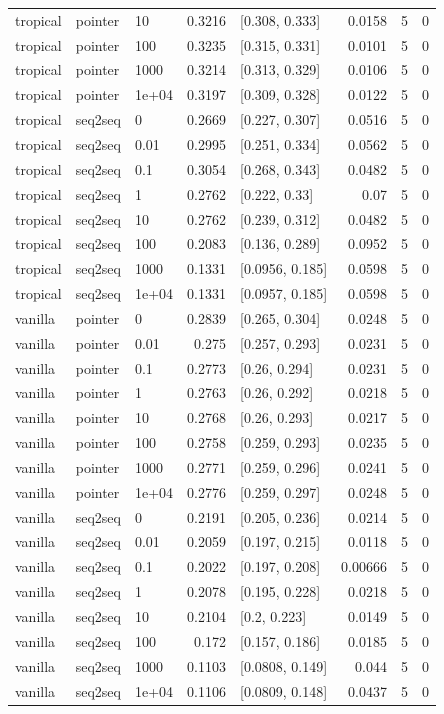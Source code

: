 \documentclass[10pt]{article}
\begin{document}
{\begin{longtable}{lllrlrrr}
tropical & pointer & 10 & 0.3216 & [0.308, 0.333] & 0.0158 & 5 & 0\\
tropical & pointer & 100 & 0.3235 & [0.315, 0.331] & 0.0101 & 5 & 0\\
tropical & pointer & 1000 & 0.3214 & [0.313, 0.329] & 0.0106 & 5 & 0\\
tropical & pointer & 1e+04 & 0.3197 & [0.309, 0.328] & 0.0122 & 5 & 0\\
tropical & seq2seq & 0 & 0.2669 & [0.227, 0.307] & 0.0516 & 5 & 0\\
tropical & seq2seq & 0.01 & 0.2995 & [0.251, 0.334] & 0.0562 & 5 & 0\\
tropical & seq2seq & 0.1 & 0.3054 & [0.268, 0.343] & 0.0482 & 5 & 0\\
tropical & seq2seq & 1 & 0.2762 & [0.222, 0.33] & 0.07 & 5 & 0\\
tropical & seq2seq & 10 & 0.2762 & [0.239, 0.312] & 0.0482 & 5 & 0\\
tropical & seq2seq & 100 & 0.2083 & [0.136, 0.289] & 0.0952 & 5 & 0\\
tropical & seq2seq & 1000 & 0.1331 & [0.0956, 0.185] & 0.0598 & 5 & 0\\
tropical & seq2seq & 1e+04 & 0.1331 & [0.0957, 0.185] & 0.0598 & 5 & 0\\
vanilla & pointer & 0 & 0.2839 & [0.265, 0.304] & 0.0248 & 5 & 0\\
vanilla & pointer & 0.01 & 0.275 & [0.257, 0.293] & 0.0231 & 5 & 0\\
vanilla & pointer & 0.1 & 0.2773 & [0.26, 0.294] & 0.0231 & 5 & 0\\
vanilla & pointer & 1 & 0.2763 & [0.26, 0.292] & 0.0218 & 5 & 0\\
vanilla & pointer & 10 & 0.2768 & [0.26, 0.293] & 0.0217 & 5 & 0\\
vanilla & pointer & 100 & 0.2758 & [0.259, 0.293] & 0.0235 & 5 & 0\\
vanilla & pointer & 1000 & 0.2771 & [0.259, 0.296] & 0.0241 & 5 & 0\\
vanilla & pointer & 1e+04 & 0.2776 & [0.259, 0.297] & 0.0248 & 5 & 0\\
vanilla & seq2seq & 0 & 0.2191 & [0.205, 0.236] & 0.0214 & 5 & 0\\
vanilla & seq2seq & 0.01 & 0.2059 & [0.197, 0.215] & 0.0118 & 5 & 0\\
vanilla & seq2seq & 0.1 & 0.2022 & [0.197, 0.208] & 0.00666 & 5 & 0\\
vanilla & seq2seq & 1 & 0.2078 & [0.195, 0.228] & 0.0218 & 5 & 0\\
vanilla & seq2seq & 10 & 0.2104 & [0.2, 0.223] & 0.0149 & 5 & 0\\
vanilla & seq2seq & 100 & 0.172 & [0.157, 0.186] & 0.0185 & 5 & 0\\
vanilla & seq2seq & 1000 & 0.1103 & [0.0808, 0.149] & 0.044 & 5 & 0\\
vanilla & seq2seq & 1e+04 & 0.1106 & [0.0809, 0.148] & 0.0437 & 5 & 0\\
\bottomrule
\end{longtable}
}
\end{document}
